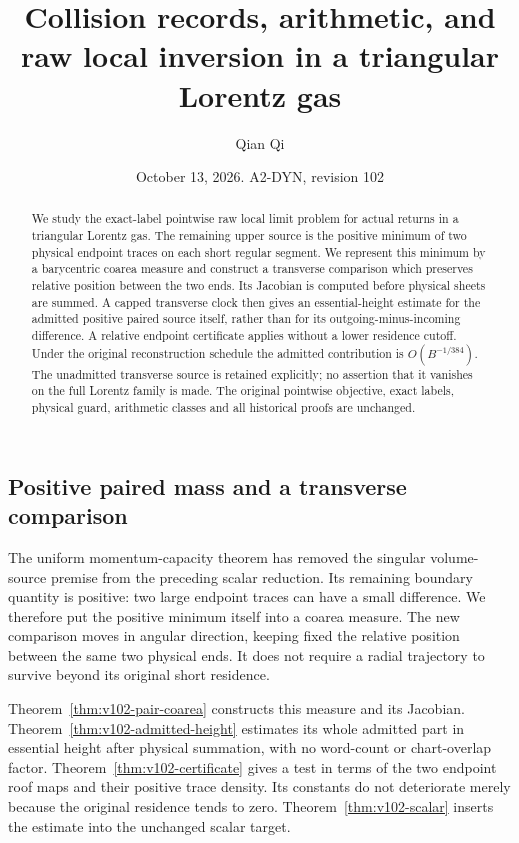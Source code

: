 \documentclass[11pt,reqno]{amsart}
\title[Collision records and raw local inversion]{Collision records, arithmetic, and raw local inversion in a triangular Lorentz gas}
\author{Qian Qi}
\date{October 13, 2026. A2-DYN, revision 102}
\numberwithin{equation}{section}
\theoremstyle{definition}
\theoremstyle{remark}\newtheorem{remark}[theorem]{Remark}
\begin{document}
\raggedbottom
\begin{abstract}
We study the exact-label pointwise raw local limit problem for actual
returns in a triangular Lorentz gas. The remaining upper source is
the positive minimum of two physical endpoint traces on each short
regular segment. We represent this minimum by a barycentric coarea
measure and construct a transverse comparison which preserves relative
position between the two ends. Its Jacobian is computed before
physical sheets are summed. A capped transverse clock then gives an
essential-height estimate for the admitted positive paired source
itself, rather than for its outgoing-minus-incoming difference.
A relative endpoint certificate applies without a lower residence
cutoff. Under the original reconstruction schedule the admitted
contribution is $O(B^{-1/384})$. The unadmitted transverse source is
retained explicitly; no assertion that it vanishes on the full Lorentz
family is made. The original pointwise objective, exact labels,
physical guard, arithmetic classes and all historical proofs are
unchanged.
\end{abstract}
\maketitle


\subsection{Positive paired mass and a transverse comparison}
The uniform momentum-capacity theorem has removed the singular
volume-source premise from the preceding scalar reduction. Its
remaining boundary quantity is positive: two large endpoint traces
can have a small difference. We therefore put the positive minimum
itself into a coarea measure. The new comparison moves in angular
direction, keeping fixed the relative position between the same two
physical ends. It does not require a radial trajectory to survive
beyond its original short residence.

Theorem~\ref{thm:v102-pair-coarea} constructs this measure and its
Jacobian. Theorem~\ref{thm:v102-admitted-height} estimates its whole
admitted part in essential height after physical summation, with no
word-count or chart-overlap factor. Theorem~\ref{thm:v102-certificate}
gives a test in terms of the two endpoint roof maps and their positive
trace density. Its constants do not deteriorate merely because the
original residence tends to zero. Theorem~\ref{thm:v102-scalar}
inserts the estimate into the unchanged scalar target.
\end{document}
